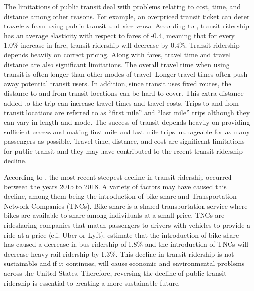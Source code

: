 \documentclass[3p, authoryear, review]{elsarticle} %
\begin{document}
The limitations of public transit deal with problems relating to cost, time, and distance among other reasons. For example, an overpriced transit ticket can deter travelers from using public transit and vice versa. According to \citet{todd}, transit ridership has an average elasticity with respect to fares of -0.4, meaning that for every 1.0\% increase in fare, transit ridership will decrease by 0.4\%. Transit ridership depends heavily on correct pricing. Along with fares, travel time and travel distance are also significant limitations. The overall travel time when using transit is often longer than other modes of travel. Longer travel times often push away potential transit users. In addition, since transit uses fixed routes, the distance to and from transit locations can be hard to cover. This extra distance added to the trip can increase travel times and travel costs. Trips to and from transit locations are referred to as ``first mile'' and ``last mile'' trips although they can vary in length and mode. The success of transit depends heavily on providing sufficient access and making first mile and last mile trips manageable for as many passengers as possible. Travel time, distance, and cost are significant limitations for public transit and they may have contributed to the recent transit ridership decline.

According to \citet{greg}, the most recent steepest decline in transit ridership occurred between the years 2015 to 2018. A variety of factors may have caused this decline, among them being the introduction of bike share and Transportation Network Companies (TNCs). Bike share is a shared transportation service where bikes are available to share among individuals at a small price. TNCs are ridesharing companies that match passengers to drivers with vehicles to provide a ride at a price (e.i. Uber or Lyft). \citet{greg} estimate that the introduction of bike share has caused a decrease in bus ridership of 1.8\% and the introduction of TNCs will decrease heavy rail ridership by 1.3\%. This decline in transit ridership is not sustainable and if it continues, will cause economic and environmental problems across the United States. Therefore, reversing the decline of public transit ridership is essential to creating a more sustainable future.
\end{document}
